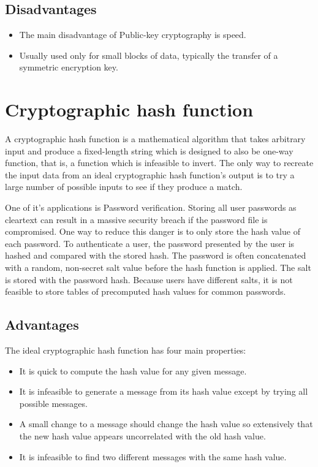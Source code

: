 \subsection{Disadvantages}
\begin{itemize}
	\item The main disadvantage of Public-key cryptography is speed.
	\item Usually used only for small blocks of data, typically the transfer of a symmetric encryption key.
\end{itemize}

\section{Cryptographic hash function}
\par A cryptographic hash function is a mathematical algorithm that takes arbitrary input and produce a fixed-length string which is designed to also be one-way function, that is, a function which is infeasible to invert. The only way to recreate the input data from an ideal cryptographic hash function's output is to try a large number of possible inputs to see if they produce a match. \par
One of it's applications is Password verification. Storing all user passwords as cleartext can result in a massive security breach if the password file is compromised. One way to reduce this danger is to only store the hash value of each password. To authenticate a user, the password presented by the user is hashed and compared with the stored hash. The password is often concatenated with a random, non-secret salt value before the hash function is applied. The salt is stored with the password hash. Because users have different salts, it is not feasible to store tables of precomputed hash values for common passwords. 
\subsection{Advantages}
The ideal cryptographic hash function has four main properties:
\begin{itemize}
	\item It is quick to compute the hash value for any given message.
	\item It is infeasible to generate a message from its hash value except by trying all possible messages.
	\item A small change to a message should change the hash value so extensively that the new hash value appears uncorrelated with the old hash value.
	\item It is infeasible to find two different messages with the same hash value.
\end{itemize}
